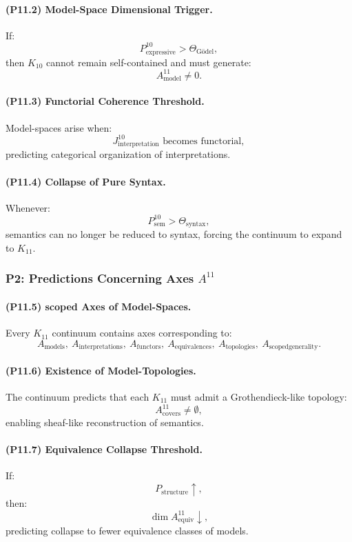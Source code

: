 \paragraph{(P11.2) Model-Space Dimensional Trigger.}
If:
\[
P_{\mathrm{expressive}}^{10} > \Theta_{\mathrm{Gödel}},
\]
then $K_{10}$ cannot remain self-contained and must generate:
\[
A_{\mathrm{model}}^{11} \neq 0.
\]

\paragraph{(P11.3) Functorial Coherence Threshold.}
Model-spaces arise when:
\[
J_{\mathrm{interpretation}}^{10} 
\text{ becomes functorial},
\]
predicting categorical organization of interpretations.

\paragraph{(P11.4) Collapse of Pure Syntax.}
Whenever:
\[
P_{\mathrm{sem}}^{10} > \Theta_{\mathrm{syntax}},
\]
semantics can no longer be reduced to syntax,  
forcing the continuum to expand to $K_{11}$.

\subsubsection{P2: Predictions Concerning Axes $A^{11}$}

\paragraph{(P11.5) scoped Axes of Model-Spaces.}
Every $K_{11}$ continuum contains axes corresponding to:
\[
A_{\mathrm{models}},\
A_{\mathrm{interpretations}},\
A_{\mathrm{functors}},\
A_{\mathrm{equivalences}},\
A_{\mathrm{topologies}},\
A_{\mathrm{scoped generality}}.
\]

\paragraph{(P11.6) Existence of Model-Topologies.}
The continuum predicts that each $K_{11}$ must admit a 
Grothendieck-like topology:
\[
A_{\mathrm{covers}}^{11} \neq \emptyset,
\]
enabling sheaf-like reconstruction of semantics.

\paragraph{(P11.7) Equivalence Collapse Threshold.}
If:
\[
P_{\mathrm{structure}} \uparrow,
\]
then:
\[
\dim A_{\mathrm{equiv}}^{11} \downarrow,
\]
predicting collapse to fewer equivalence classes of models.

